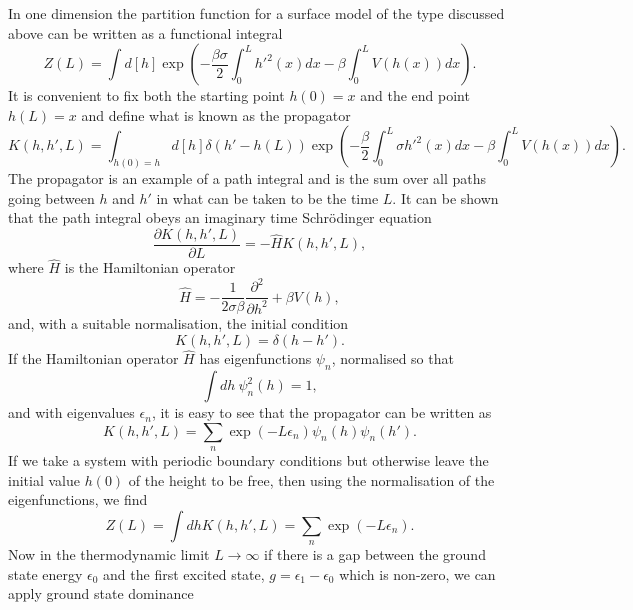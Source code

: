 In one dimension the partition function for a surface model of the type discussed above can be written as a functional integral  
\begin{equation}
Z(L)  = \int d[h]\exp\left(-\frac{\beta\sigma}{2}\int_0^L h'^2(x) dx -\beta\int_0^L  V(h(x)) dx\right).
\end{equation}
It is convenient to fix both the starting point $h(0)=x$ and the end point $h(L)=x$ and define what is known as the propagator
\begin{equation}
K(h,h',L)=\int_{h(0)=h} d[h] \delta(h' -h(L)) \exp\left(-\frac{\beta}{2}\int_0^L \sigma h'^2(x) dx -\beta \int_0^L  V(h(x)) dx\right).\label{prog}
\end{equation}
The propagator is an example of a path integral and is the sum over all paths going between 
$h$ and $h'$ in what can be taken to be the time $L$.  It can be shown that the path integral obeys an imaginary time Schr\"odinger equation
\begin{equation}
\frac{\partial  K(h,h',L)}{\partial L} = -\hat H K(h,h',L),
\end{equation}
where $\hat H$ is the Hamiltonian operator
\begin{equation}
\hat H = -\frac{1}{2\sigma\beta}\frac{\partial^2 }{\partial h^2} + \beta V(h),
\end{equation}
and, with a suitable normalisation, the initial condition
\begin{equation}
K(h,h',L)=\delta(h-h').
\end{equation}
If the Hamiltonian operator $\hat H$ has eigenfunctions $\psi_n$, normalised so that
\begin{equation}
\int dh \ \psi^2_n(h) = 1,
\end{equation}
 and with eigenvalues $\epsilon_n$, it is easy to see that the propagator can be written as
\begin{equation}
K(h,h',L)= \sum_n \exp(-L\epsilon_n)\psi_n(h)\psi_n(h').
\end{equation}
If we take a system with periodic boundary conditions but otherwise leave the initial value $h(0)$ of the height to be free, then using the normalisation of the eigenfunctions, we find
\begin{equation}
Z(L) = \int dh K(h,h',L) = \sum_n \exp(-L\epsilon_n).
\end{equation}
Now in the thermodynamic limit $L\to\infty$ if there is a gap between the ground state energy
$\epsilon_0$ and the first excited state, $g=\epsilon_1-\epsilon_0$ which is non-zero, we can apply ground state dominance 
